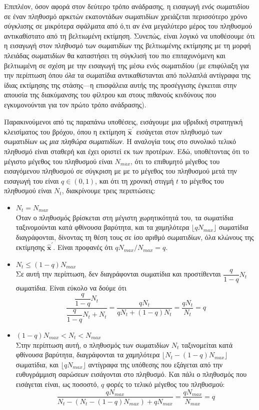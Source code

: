 Επιπλέον, όσον αφορά στον δεύτερο τρόπο ανάδρασης, η εισαγωγή \textit{ενός}
σωματιδίου σε έναν πληθυσμό αρκετών εκατοντάδων σωματιδίων χρειάζεται
περισσότερο χρόνο σύγκλισης σε μικρότερα σφάλματα από ό,τι αν ένα μεγαλύτερο
μέρος του πληθυσμού αντικαθίστατο από τη βελτιωμένη εκτίμηση.  Συνεπώς, είναι
λογικό να υποθέσουμε ότι η εισαγωγή στον πληθυσμό των σωματιδίων της
βελτιωμένης εκτίμησης με τη μορφή πλειάδας σωματιδίων θα καταστήσει τη σύγκλισή
του πιο επιταχυνόμενη και βελτιωμένη σε σχέση με την εισαγωγή της μέσω ενός
σωματιδίου (με επιφύλαξη για την περίπτωση όπου \textit{όλα} τα σωματίδια
αντικαθίστανται από πολλαπλά αντίγραφα της ίδιας εκτίμησης της στάσης---η
επισφάλεια αυτής της προσέγγισης έγκειται στην απουσία της διακύμανσης του
φίλτρου και στους πιθανούς κινδύνους που εγκυμονούνται για τον πρώτο τρόπο
ανάδρασης).

Παρακινούμενοι από τις παραπάνω υποθέσεις, εισάγουμε μια υβριδική στρατηγική
κλεισίματος του βρόχου, όπου η εκτίμηση $\hat{\bm{x}}^{\prime}$ εισάγεται στον
πληθυσμό των σωματιδίων ως \textit{μια πληθώρα σωματιδίων}. Η αναλογία τους στο
συνολικό τελικό πληθυσμό είναι σταθερή και έχει οριστεί εκ των προτέρων. Εδώ,
υποθέτοντας ότι το μέγιστο μέγεθος του πληθυσμού είναι $N_{max}$, ότι το
επιθυμητό μέγεθος του εισαγόμενου πληθυσμού σε σύγκριση με με το μέγεθος του
πληθυσμού μετά την εισαγωγή του είναι $q \in (0,1)$, και ότι τη χρονική στιγμή
$t$ το μέγεθος του πληθυσμού είναι $N_t$, διακρίνουμε τρεις περιπτώσεις:

\begin{itemize}
  \item $N_t = N_{max}$ \\
        Όταν ο πληθυσμός βρίσκεται στη μέγιστη χωρητικότητά του, τα σωματίδια
        ταξινομούνται κατά φθίνουσα βαρύτητα, και τα χαμηλότερα
        $\lfloor q N_{max} \rfloor$ σωματίδια διαγράφονται, δίνοντας τη θέση
        τους σε ίσο αριθμό σωματιδίων, όλα κλώνους της εκτίμησης
        $\hat{\bm{x}}^{\prime}$. Είναι προφανές ότι $q N_{max}/N_{max} = q$.
  \item $N_t \leq (1-q) N_{max}$ \\
        Σε αυτή την περίπτωση, δεν διαγράφονται σωματίδια και προστίθενται
        $\dfrac{q}{1-q}N_t$ σωματίδια. Είναι εύκολο να δούμε ότι
        $$\dfrac{\dfrac{q}{1-q}N_t}{\dfrac{q}{1-q}N_t + N_t} = \dfrac{qN_t}{qN_t + (1-q)N_t} = \dfrac{qN_t}{N_t} = q$$
  \item $(1-q) N_{max} < N_t < N_{max}$ \\
        Στην περίπτωση αυτή, ο πληθυσμός των σωματιδίων $N_t$ ταξινομείται κατά
        φθίνουσα βαρύτητα, διαγράφονται τα χαμηλότερα $\lfloor N_t - (1-q)N_{max} \rfloor$
        σωματίδια, και $\lfloor q N_{max} \rfloor$ αντίγραφα της υπόθεσης που
        εξάγεται από την ευθυγράμμιση σαρώσεων εισάγονται στο πληθυσμό. Και
        πάλι ο πληθυσμός που εισάγεται είναι, ως ποσοστό, $q$ φορές το τελικό
        μέγεθος του πληθυσμού:
        $$\dfrac{qN_{max}}{N_t - (N_t - (1-q)N_{max}) + qN_{max}} = \dfrac{q N_{max}}{N_{max}} = q$$
\end{itemize}

